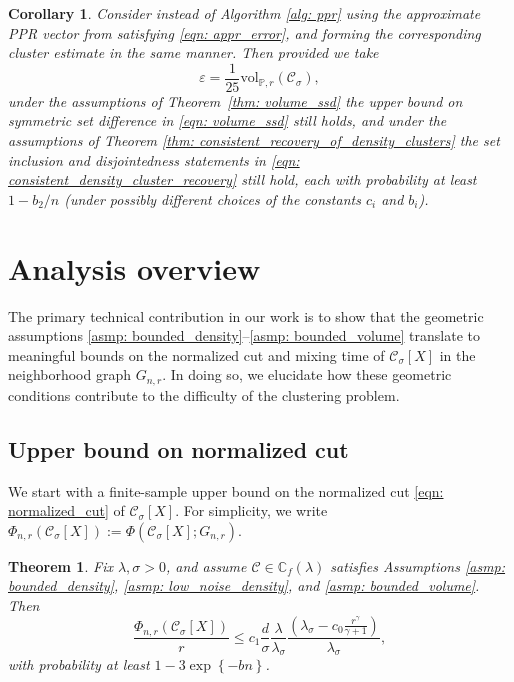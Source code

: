 \documentclass[11pt,twoside]{article}
\newtheorem{theorem}{Theorem}
\newtheorem{corollary}{Corollary}
\theoremstyle{definition}
\newcommand{\set}[1]{\left\{#1\right\}}
\newcommand{\vol}{\mathrm{vol}}
\newcommand{\1}{\mathbbm{1}}
\newcommand{\Xbf}{X}
\newcommand{\Pbb}{\mathbb{P}}
\newcommand{\Cbb}{\mathbb{C}}
\newcommand{\Cset}{\mathcal{C}}
\newcommand{\Csig}{\Cset_{\sigma}}
\newcommand{\Cest}{\widehat{C}}
\begin{document}
\begin{corollary}
  \label{cor: appr}
  Consider instead of
  Algorithm \ref{alg: ppr} using the approximate PPR vector from
  \citet{andersen2006} satisfying \eqref{eqn: appr_error}, and forming the 
  corresponding cluster estimate \smash{$\Cest$} in the same manner.  Then 
  provided we take 
  \begin{equation}
    \label{eqn: appr_parameter}
    \varepsilon = \frac{1}{25} \vol_{\Pbb,r}(\Csig),
  \end{equation}
  under the assumptions of Theorem~\ref{thm: volume_ssd} the upper bound on symmetric set difference in \eqref{eqn: volume_ssd} still
  holds, and under the assumptions of Theorem \ref{thm: consistent_recovery_of_density_clusters} the set inclusion and disjointedness statements in \eqref{eqn: consistent_density_cluster_recovery} still hold, each with probability at least $1 - b_2/n$ (under possibly different choices of the constants $c_i$ and $b_i$).
\end{corollary}

\section{Analysis overview}
\label{sec: analysis}

The primary technical contribution in our work is to show that the
geometric assumptions \ref{asmp: bounded_density}--\ref{asmp: bounded_volume} 
translate to  meaningful bounds on the normalized cut and mixing time of 
$\Csig[\Xbf]$ in the neighborhood graph $G_{n,r}$. In doing so, we elucidate 
how these geometric conditions contribute to the difficulty of the clustering 
problem.   

\subsection{Upper bound on normalized cut} 

We start with a finite-sample upper bound on the normalized cut \eqref{eqn:
  normalized_cut} of $\Cset_\sigma[\Xbf]$. For simplicity, we write
$\Phi_{n,r}(\Csig[\Xbf]) := \Phi(\Csig[\Xbf]; G_{n,r})$.  

\begin{theorem}
  \label{thm: conductance_upper_bound}
  Fix $\lambda,\sigma>0$, and assume $\Cset \in \Cbb_f(\lambda)$ satisfies    
  Assumptions \ref{asmp: bounded_density}, \ref{asmp: low_noise_density}, and   
  \ref{asmp: bounded_volume}. Then
  \begin{equation}
    \label{eqn: conductance_additive_error_bound}
    \frac{\Phi_{n,r}(\Csig[\Xbf])}{r} \leq c_1 \frac{d}{\sigma}
    \frac{\lambda}{\lambda_{\sigma}} \frac{(\lambda_{\sigma} -
      c_0\frac{r^{\gamma}}{\gamma+1})}{\lambda_{\sigma}},
  \end{equation}
  with probability at least $1 - 3\exp\set{-b n}$. 
\end{theorem}
\end{document}
